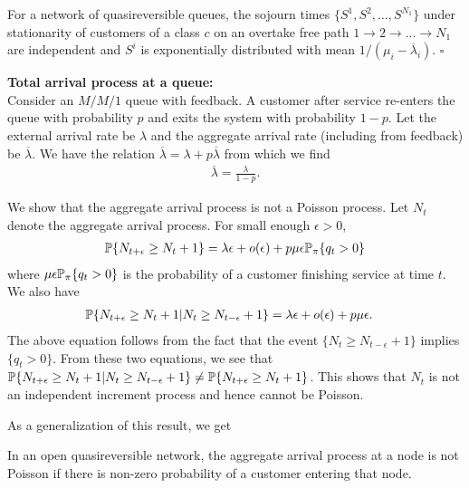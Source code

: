 \documentclass[all-lectures.tex]{subfiles}
\newcommand*{\QEDB}{\hfill\ensuremath{\square}}%
\begin{document}
\begin{thm}
For a network of quasireversible queues, the sojourn times $\{S^1,S^2,\dots,S^{N_1}\}$ under stationarity of customers of a class $c$ on an overtake free path $1\to 2 \to ... \to N_1$ are independent and $S^i$ is exponentially distributed with mean $1/(\mu_i - \overline{\lambda}_i)$. \QEDB
\end{thm}

\noindent \textbf{Total arrival process at a queue:}  \\
\indent Consider an $M/M/1$ queue with feedback. A customer after service re-enters the queue with probability $p$ and exits the system with probability $1-p$. Let the external arrival rate be $\lambda$ and the aggregate arrival rate (including from feedback) be $\overline{\lambda}$. We have the relation $\overline{\lambda} = \lambda + p \overline{\lambda}$ from which we find
\begin{align*}
\overline{\lambda} = \frac{\lambda}{1-p}.
\end{align*}

We show that the aggregate arrival process is not a Poisson process. Let $N_t$ denote the aggregate arrival process. For small enough $\epsilon >0$,
\begin{align*}
\P\{N_{t+\epsilon} \geq N_t + 1\} = \lambda \epsilon + o(\epsilon) + p \mu \epsilon \P_{\pi}\{q_t > 0\}
\end{align*}
where $\mu \epsilon \P_{\pi}\{q_t > 0\}$ is the probability of a customer finishing service at time $t$. We also have \begin{align*}
\P\{N_{t+\epsilon} \geq N_t + 1| N_{t} \geq N_{t-\epsilon} + 1\} &= \lambda \epsilon + o(\epsilon) + p \mu \epsilon.
\end{align*}
The above equation follows from the fact that the event $\{N_{t} \geq N_{t-\epsilon} + 1\}$ implies $\{q_t > 0\}$. From these two equations, we see that $\P\{N_{t+\epsilon} \geq N_t + 1| N_{t} \geq N_{t-\epsilon} + 1\} \neq \P\{N_{t+\epsilon} \geq N_t + 1\}$. This shows that $N_t$ is not an independent increment process and hence cannot be Poisson. 

\indent As a generalization of this result, we get 
\begin{thm}
In an open quasireversible network, the aggregate arrival process at a node is not Poisson if there is non-zero probability of a customer entering that node.
\end{thm}
\end{document}
